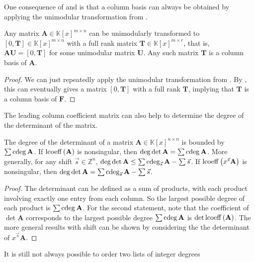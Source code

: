 One consequence of 
and  is that a column
basis can always be obtained by applying the unimodular transformation
from .
\begin{cor}
\label{cor:unimodularlyReduceToColumnBasis}Any matrix $\mathbf{A}\in\mathbb{K}\left[x\right]^{m\times n}$
can be unimodularly transformed to $\left[0,\mathbf{T}\right]\in\mathbb{K}\left[x\right]^{m\times n}$
with a full rank matrix $\mathbf{T}\in\mathbb{K}\left[x\right]^{m\times r}$,
that is, $\mathbf{A}\mathbf{U}=\left[0,\mathbf{T}\right]$ for some
unimodular matrix $\mathbf{U}$. Any such matrix $\mathbf{T}$ is
a column basis of $\mathbf{A}$.\end{cor}
\begin{proof}
We can just repeatedly apply the unimodular transformation from .
By , this can eventually
gives a matrix $\left[0,\mathbf{T}\right]$ with a full rank $\mathbf{T}$,
implying that $\mathbf{T}$ is a column basis of $\mathbf{F}$.
\end{proof}
The leading column coefficient matrix can also help to determine the
degree of the determinant of the matrix.
\begin{lem}
\label{lem:fullRankLeadingCoefficientAndDegreeOfDetermant}The degree
of the determinant of a matrix $\mathbf{A}\in\mathbb{K}\left[x\right]^{n\times n}$
is bounded by $\sum\cdeg\mathbf{A}$. If $\operatorname{lcoeff}\left(\mathbf{A}\right)$
is nonsingular, then $\deg\det\mathbf{A}=\sum\cdeg\mathbf{A}$. More
generally, for any shift $\vec{s}\in\mathbb{Z}^{n}$, $\deg\det\mathbf{A}\le\sum\cdeg_{\vec{s}}\mathbf{A}-\sum\vec{s}$.
If $\operatorname{lcoeff}\left(x^{\vec{s}}\mathbf{A}\right)$ is nonsingular, then
$\deg\det\mathbf{A}=\sum\cdeg_{\vec{s}}\mathbf{A}-\sum\vec{s}$.\end{lem}
\begin{proof}
The determinant can be defined as a sum of products, with each product
involving exactly one entry from each column. So the largest possible
degree of each product is $\sum\cdeg\mathbf{A}$. For the second statement,
note that the coefficient of $\det\mathbf{A}$ corresponds to the
largest possible degree $\sum\cdeg\mathbf{A}$ is $\det\operatorname{lcoeff}\left(\mathbf{A}\right)$.
The more general results with shift can be shown by considering the
the determinant of $x^{\vec{s}}\mathbf{A}$.
\end{proof}
It is still not always possible to order two lists of integer degrees
